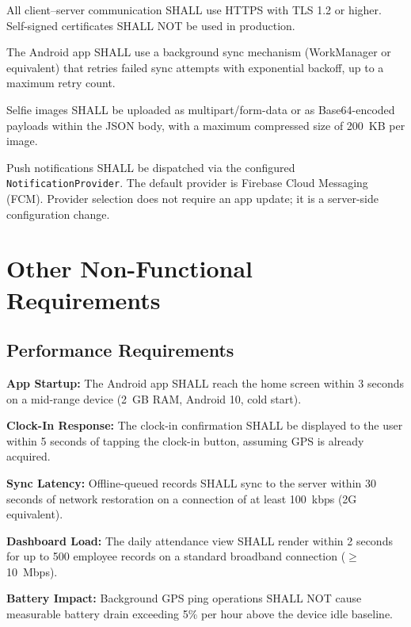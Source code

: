 \documentclass[12pt, a4paper]{article}
\begin{document}
\begin{description}[leftmargin=3cm, style=nextline]
    \item[HTTPS / TLS]
        All client--server communication SHALL use HTTPS with TLS 1.2
        or higher. Self-signed certificates SHALL NOT be used in
        production.
    \item[Sync Protocol]
        The Android app SHALL use a background sync mechanism (WorkManager
        or equivalent) that retries failed sync attempts with exponential
        backoff, up to a maximum retry count.
    \item[Image Upload]
        Selfie images SHALL be uploaded as multipart/form-data or as
        Base64-encoded payloads within the JSON body, with a maximum
        compressed size of 200~KB per image.
    \item[Push Notifications]
        Push notifications SHALL be dispatched via the configured
        \texttt{NotificationProvider}. The default provider is Firebase
        Cloud Messaging (FCM). Provider selection does not require an
        app update; it is a server-side configuration change.
\end{description}

\section{Other Non-Functional Requirements}

\subsection{Performance Requirements}

\begin{description}[leftmargin=2.5cm, style=nextline]
    \item[NFR-01]
        \textbf{App Startup:} The Android app SHALL reach the home screen
        within 3 seconds on a mid-range device (2~GB RAM, Android 10,
        cold start).
    \item[NFR-02]
        \textbf{Clock-In Response:} The clock-in confirmation SHALL be
        displayed to the user within 5 seconds of tapping the clock-in
        button, assuming GPS is already acquired.
    \item[NFR-03]
        \textbf{Sync Latency:} Offline-queued records SHALL sync to the
        server within 30 seconds of network restoration on a connection
        of at least 100~kbps (2G equivalent).
    \item[NFR-04]
        \textbf{Dashboard Load:} The daily attendance view SHALL render
        within 2 seconds for up to 500 employee records on a standard
        broadband connection ($\geq$ 10~Mbps).
    \item[NFR-05]
        \textbf{Battery Impact:} Background GPS ping operations SHALL NOT
        cause measurable battery drain exceeding 5\% per hour above the
        device idle baseline.
\end{description}
\end{document}
